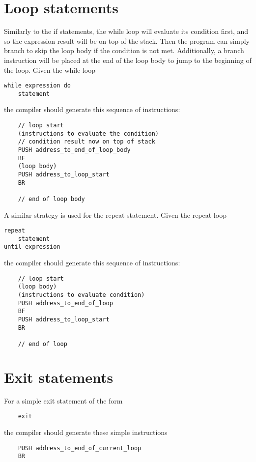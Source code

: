 \documentclass{article}
\begin{document}
\newpage
\section{Loop statements}
Similarly to the if statements, the while loop will evaluate its condition first, and so the expression result will be on top of the stack. Then the program can simply branch to skip the loop body if the condition is not met. Additionally, a branch instruction will be placed at the end of the loop body to jump to the beginning of the loop.
\newline
\newline
Given the while loop
\begin{lstlisting}
while expression do
    statement
\end{lstlisting}
the compiler should generate this sequence of instructions:
\begin{lstlisting}
    // loop start
    (instructions to evaluate the condition)
    // condition result now on top of stack
    PUSH address_to_end_of_loop_body
    BF
    (loop body)
    PUSH address_to_loop_start
    BR
    
    // end of loop body
\end{lstlisting}
\newline
A similar strategy is used for the repeat statement.
\newline
Given the repeat loop
\begin{lstlisting}
repeat
    statement
until expression
\end{lstlisting}
the compiler should generate this sequence of instructions:
\begin{lstlisting}
    // loop start
    (loop body)
    (instructions to evaluate condition)
    PUSH address_to_end_of_loop
    BF
    PUSH address_to_loop_start
    BR
    
    // end of loop
\end{lstlisting}

\newpage
\section{Exit statements}

For a simple exit statement of the form
\begin{lstlisting}
    exit
\end{lstlisting}
the compiler should generate these simple instructions
\begin{lstlisting}
    PUSH address_to_end_of_current_loop
    BR
\end{lstlisting}
\end{document}
